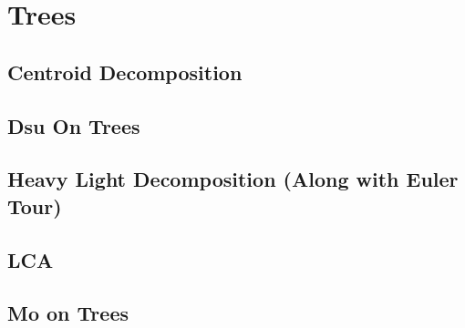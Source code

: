\section{Trees}
\subsection{Centroid Decomposition}
\raggedbottom
\hrulefill
\subsection{Dsu On Trees}
\raggedbottom
\hrulefill
\subsection{Heavy Light Decomposition (Along with Euler Tour)}
\raggedbottom
\hrulefill
\subsection{LCA}
\raggedbottom
\hrulefill
\subsection{Mo on Trees}
\raggedbottom
\hrulefill


